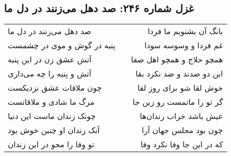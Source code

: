 \begin{center}
\section*{غزل شماره ۲۴۶: صد دهل می‌زنند در دل ما}
\label{sec:0246}
\begin{longtable}{l p{0.5cm} r}
صد دهل می‌زنند در دل ما
&&
بانگ آن بشنویم ما فردا
\\
پنبه در گوش و موی در چشمست
&&
غم فردا و وسوسه سودا
\\
آتش عشق زن در این پنبه
&&
همچو حلاج و همچو اهل صفا
\\
آتش و پنبه را چه می‌داری
&&
این دو ضدند و ضد نکرد بقا
\\
چون ملاقات عشق نزدیکست
&&
خوش لقا شو برای روز لقا
\\
مرگ ما شادی و ملاقاتست
&&
گر تو را ماتمست رو زین جا
\\
چونک زندان ماست این دنیا
&&
عیش باشد خراب زندان‌ها
\\
آنک زندان او چنین خوش بود
&&
چون بود مجلس جهان آرا
\\
تو وفا را مجو در این زندان
&&
که در این جا وفا نکرد وفا
\\
\end{longtable}
\end{center}
